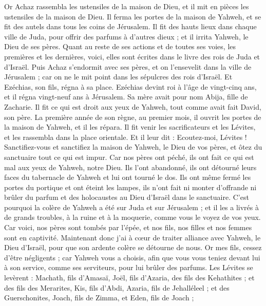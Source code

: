 \begin{multicols}{2}
Or Achaz rassembla les ustensiles de la maison de Dieu, et il mit en pièces les ustensiles de la maison de Dieu. Il ferma les portes de la maison de Yahweh, et se fit des autels dans tous les coins de Jérusalem.
Il fit des hauts lieux dans chaque ville de Juda, pour offrir des parfums à d'autres dieux ; et il irrita Yahweh, le Dieu de ses pères.
Quant au reste de ses actions et de toutes ses voies, les premières et les dernières, voici, elles sont écrites dans le livre des rois de Juda et d'Israël.
Puis Achaz s'endormit avec ses pères, et on l'ensevelit dans la ville de Jérusalem ; car on ne le mit point dans les sépulcres des rois d'Israël. Et Ezéchias, son fils, régna à sa place.
\VerseOne{}Ezéchias devint roi à l'âge de vingt-cinq ans, et il régna vingt-neuf ans à Jérusalem. Sa mère avait pour nom Abija, fille de Zacharie.
Il fit ce qui est droit aux yeux de Yahweh, tout comme avait fait David, son père.
La première année de son règne, au premier mois, il ouvrit les portes de la maison de Yahweh, et il les répara.
Il fit venir les sacrificateurs et les Lévites, et les rassembla dans la place orientale.
Et il leur dit : Ecoutez-moi, Lévites ! Sanctifiez-vous et sanctifiez la maison de Yahweh, le Dieu de vos pères, et ôtez du sanctuaire tout ce qui est impur.
Car nos pères ont péché, ils ont fait ce qui est mal aux yeux de Yahweh, notre Dieu. Ils l'ont abandonné, ils ont détourné leurs faces du tabernacle de Yahweh et lui ont tourné le dos.
Ils ont même fermé les portes du portique et ont éteint les lampes, ils n'ont fait ni monter d'offrande ni brûler du parfum et des holocaustes au Dieu d'Israël dans le sanctuaire.
C'est pourquoi la colère de Yahweh a été sur Juda et sur Jérusalem ; et il les a livrés à de grands troubles, à la ruine et à la moquerie, comme vous le voyez de vos yeux.
Car voici, nos pères sont tombés par l'épée, et nos fils, nos filles et nos femmes sont en captivité.
Maintenant donc j'ai à cœur de traiter alliance avec Yahweh, le Dieu d'Israël, pour que son ardente colère se détourne de nous.
Or mes fils, cessez d'être négligents ; car Yahweh vous a choisis, afin que vous vous teniez devant lui à son service, comme ses serviteurs, pour lui brûler des parfums.
Les Lévites se levèrent : Machath, fils d'Amasaï, Joël, fils d'Azaria, des fils des Kehathites ; et des fils des Merarites, Kis, fils d'Abdi, Azaria, fils de Jehalléleel ; et des Guerschonites, Joach, fils de Zimma, et Eden, fils de Joach ;

\end{multicols}

